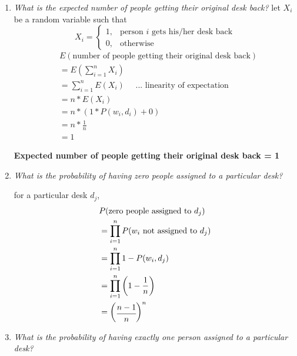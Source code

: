 \documentclass{homeworg}
\begin{document}
\begin{enumerate}[label=\alph*)]
    \item \emph{What is the expected number of people getting their original desk back?}
    let $X_i$ be a random variable such that 
    \[
        X_i = \begin{cases}
			1, & \text{person $i$ gets his/her desk back}\\
            0, & \text{otherwise}
		 \end{cases}
    \]
    \begin{align*}
        & E(\text{number of people getting their original desk back}) \\
        & = E(\sum_{i=1}^n X_i) \\
        & = \sum_{i=1}^n E(X_i) \quad \text{ ... linearity of expectation}\\ 
        & = n \ast E(X_i) \\
        & = n \ast (1 \ast P(w_i, d_i) + 0) \\
        & = n \ast \frac{1}{n}\\
        & = 1
    \end{align*}
    
    \textbf{Expected number of people getting their original desk back = 1}
    
    \item \emph{What is the probability of having zero people assigned to a particular desk?}
    
    for a particular desk $d_j$,
    \begin{align*}
        & P(\text{zero people assigned to}\ d_j) \\
        & = \prod_{i = 1}^{n} P(w_i \text{ not assigned to}\ d_j) \\
        & = \prod_{i = 1}^{n} 1- P(w_i, d_j)\\
        & = \prod_{i = 1}^{n} \left(1-\frac{1}{n}\right)\\
        & = \begin{pmatrix}
                \cfrac{n-1}{n}
            \end{pmatrix}^n
    \end{align*}
    
    \item \emph{What is the probability of having exactly one person assigned to a particular desk?}
    

\end{enumerate}
\end{document}
